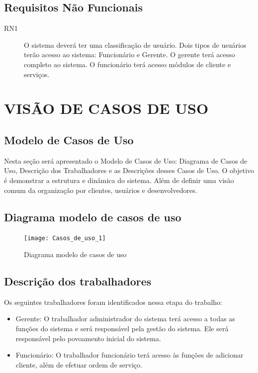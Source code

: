 \documentclass[
	12pt,				%
	openright,
	oneside,			%
	a4paper,			%
	chapter=TITLE,		%
	brazil				%
	]{abntex2}
\begin{document}
\section{Requisitos Não Funcionais}

\begin{description}
	\item[RN1] O sistema deverá ter uma classificação de usuário. Dois tipos de usuários terão acesso ao sistema: Funcionário e Gerente. O gerente terá acesso completo ao sistema. O funcionário terá acesso módulos de cliente e serviços. 
\end{description}


\newpage
\chapter{VISÃO DE CASOS DE USO}

\section{Modelo de Casos de Uso}

Nesta seção será apresentado o Modelo de Casos de Uso: Diagrama de Casos de Uso, Descrição dos Trabalhadores e as Descrições desses Casos de Uso. O objetivo é demonstrar a estrutura e dinâmica do sistema. Além de definir uma visão comum da organização por  clientes, usuários e desenvolvedores.

\section{Diagrama modelo de casos de uso}

\begin{figure}[htb]
	\caption{Diagrama modelo de casos de uso}
	\begin{flushleft}
	    \texttt{[image: Casos\_de\_uso\_1]}  %
	\end{flushleft}
\end{figure}

\section{Descrição dos trabalhadores}

Os seguintes trabalhadores foram identificados nessa etapa do trabalho: 

\begin{itemize}
	\item Gerente: O trabalhador administrador do sistema terá acesso a todas as funções do sistema e será responsável pela gestão do sistema. Ele será responsável pelo povoamento inicial do sistema. 
	
	\item Funcionário: O trabalhador funcionário terá acesso às funções de adicionar cliente, além de efetuar ordem de serviço.
	
\end{itemize}
\end{document}
